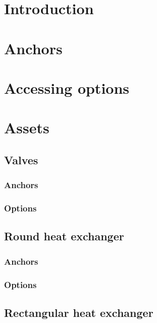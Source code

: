 \documentclass[a4paper, twoside]{article}
\begin{document}
\tableofcontents

\newpage

\section{Introduction}

\section{Anchors}
    

\section{Accessing options}
    

\section{Assets}
    \label{sec: Assets}
    \subsection{Valves}
        \subsubsection{Anchors}
            

        \subsubsection{Options}
            

    \subsection{Round heat exchanger}
        \subsubsection{Anchors}
            

        \subsubsection{Options}
            

    \subsection{Rectangular heat exchanger}
\end{document}
